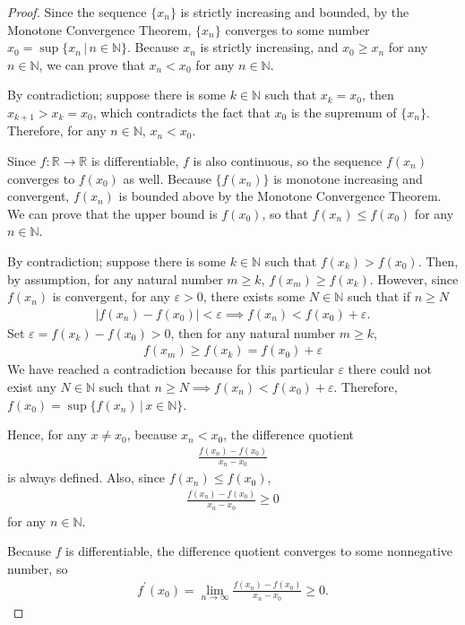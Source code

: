 \documentclass[12pt]{article}
\newcommand{\N}{\ensuremath{\mathbb{N}}}
\newcommand{\R}{\ensuremath{\mathbb{R}}}
\begin{document}
\begin{proof}
  Since the sequence $\{x_n\}$ is strictly increasing and bounded, by the Monotone Convergence Theorem, $\{x_n\}$ converges to some number $x_0 = \sup \{x_n \,|\, n \in \N\}$. Because $x_n$ is strictly increasing, and $x_0 \geq x_n$ for any $n \in \N$, we can prove that $x_n < x_0$ for any $n \in \N$.

  By contradiction; suppose there is some $k \in \N$ such that $x_k = x_0$, then $x_{k+1} > x_k = x_0$, which contradicts the fact that $x_0$ is the supremum of $\{x_n\}$. Therefore, for any $n \in \N$, $x_n < x_0$.

  Since $f:\R \rightarrow \R$ is differentiable, $f$ is also continuous, so the sequence $f(x_n)$ converges to $f(x_0)$ as well. Because $\{f(x_n)\}$ is monotone increasing and convergent, $f(x_n)$ is bounded above by the Monotone Convergence Theorem. We can prove that the upper bound is $f(x_0)$, so that $f(x_n) \leq f(x_0)$ for any $n \in \N$.

  By contradiction; suppose there is some $k \in \N$ such that $f(x_k) > f(x_0)$. Then, by assumption, for any natural number $m \geq k$, $f(x_m) \geq f(x_k)$. However, since $f(x_n)$ is convergent, for any $\varepsilon > 0$, there exists some $N\in \N$ such that if $n \geq N$
  \begin{align*}
    |f(x_n) - f(x_0)| < \varepsilon \implies f(x_n)< f(x_0) + \varepsilon.
  \end{align*}
  Set $\varepsilon = f(x_k) - f(x_0) > 0$, then for any natural number $m \geq k$,
  \begin{align*}
    f(x_m) \geq f(x_k) = f(x_0) + \varepsilon
  \end{align*}
  We have reached a contradiction because for this particular $\varepsilon$ there could not exist any $N \in \N$ such that $n \geq N \implies f(x_n)< f(x_0)+\varepsilon$.
  Therefore, $f(x_0) = \sup \{f(x_n) \,|\, x \in \N\}$.

  Hence, for any $x \not=x_0$, because $x_n < x_0$, the difference quotient
  \begin{align*}
    \frac{f(x_n)-f(x_0)}{x_n-x_0}
  \end{align*}
  is always defined. Also, since $f(x_n) \leq f(x_0)$,
  \begin{align*}
    \frac{f(x_n)-f(x_0)}{x_n-x_0} \geq 0
  \end{align*}
  for any $n \in \N$.

  Because $f$ is differentiable, the difference quotient converges to some nonnegative number, so
  \begin{align*}
    f^\prime(x_0) = \lim_{n \to \infty} \frac{f(x_n)-f(x_0)}{x_n-x_0} \geq 0.
  \end{align*}
\end{proof}
\end{document}
